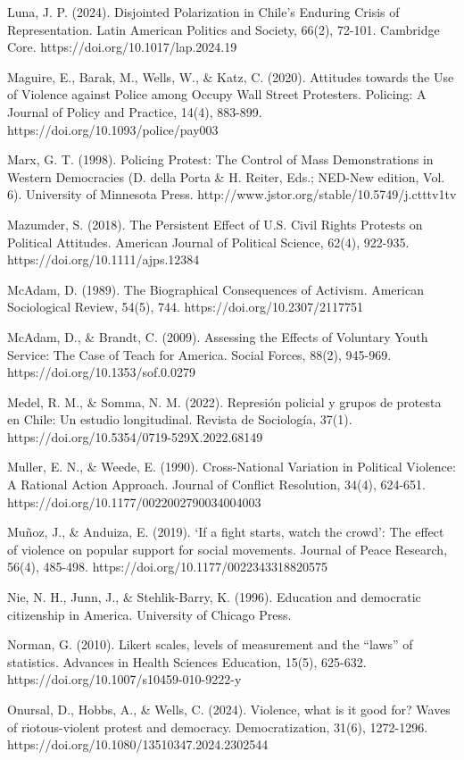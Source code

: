 \documentclass[
  13pt,
]{article}
\begin{document}
Luna, J. P. (2024). Disjointed Polarization in Chile's Enduring Crisis
of Representation. Latin American Politics and Society, 66(2), 72-101.
Cambridge Core. https://doi.org/10.1017/lap.2024.19

Maguire, E., Barak, M., Wells, W., \& Katz, C. (2020). Attitudes towards
the Use of Violence against Police among Occupy Wall Street Protesters.
Policing: A Journal of Policy and Practice, 14(4), 883-899.
https://doi.org/10.1093/police/pay003

Marx, G. T. (1998). Policing Protest: The Control of Mass Demonstrations
in Western Democracies (D. della Porta \& H. Reiter, Eds.; NED-New
edition, Vol. 6). University of Minnesota Press.
http://www.jstor.org/stable/10.5749/j.ctttv1tv

Mazumder, S. (2018). The Persistent Effect of U.S. Civil Rights Protests
on Political Attitudes. American Journal of Political Science, 62(4),
922-935. https://doi.org/10.1111/ajps.12384

McAdam, D. (1989). The Biographical Consequences of Activism. American
Sociological Review, 54(5), 744. https://doi.org/10.2307/2117751

McAdam, D., \& Brandt, C. (2009). Assessing the Effects of Voluntary
Youth Service: The Case of Teach for America. Social Forces, 88(2),
945-969. https://doi.org/10.1353/sof.0.0279

Medel, R. M., \& Somma, N. M. (2022). Represión policial y grupos de
protesta en Chile: Un estudio longitudinal. Revista de Sociología,
37(1). https://doi.org/10.5354/0719-529X.2022.68149

Muller, E. N., \& Weede, E. (1990). Cross-National Variation in
Political Violence: A Rational Action Approach. Journal of Conflict
Resolution, 34(4), 624-651. https://doi.org/10.1177/0022002790034004003

Muñoz, J., \& Anduiza, E. (2019). `If a fight starts, watch the crowd':
The effect of violence on popular support for social movements. Journal
of Peace Research, 56(4), 485-498.
https://doi.org/10.1177/0022343318820575

Nie, N. H., Junn, J., \& Stehlik-Barry, K. (1996). Education and
democratic citizenship in America. University of Chicago Press.

Norman, G. (2010). Likert scales, levels of measurement and the ``laws''
of statistics. Advances in Health Sciences Education, 15(5), 625-632.
https://doi.org/10.1007/s10459-010-9222-y

Onursal, D., Hobbs, A., \& Wells, C. (2024). Violence, what is it good
for? Waves of riotous-violent protest and democracy. Democratization,
31(6), 1272-1296. https://doi.org/10.1080/13510347.2024.2302544
\end{document}
